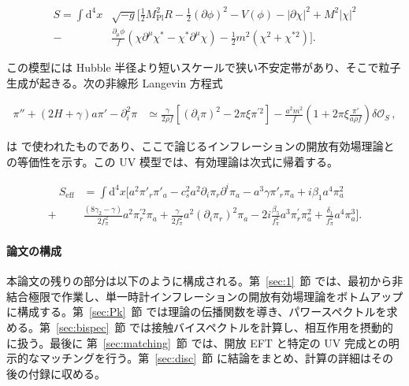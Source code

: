 \documentclass[a4paper,11pt]{ltjsarticle}
\numberwithin{equation}{section}
\def\pia{\pi_{a}}
\def\pir{\pi_{r}}
\newcommand{\dd}{\mathrm{d}}
\newcommand{\Sec}[1]{Sec.~\ref{#1}}
\renewcommand{\Sec}[1]{第~\ref{#1}~節}
\begin{document}
\begin{align}\label{eq:actionmatchintro}
S= \int \dd^4 x &\sqrt{- g} \bigg[ \frac{1}{2} M_{\mathrm{Pl}}^2  R - \frac{1}{2} \left(\partial \phi \right)^2 - V(\phi) - \left|\partial \chi \right|^2 + M^2 \left| \chi \right|^2 \nonumber \\
- &\frac{\partial_\mu \phi}{f}\left( \chi \partial^\mu \chi^* - \chi^* \partial^\mu \chi\right) - \frac{1}{2}m^2\left(\chi^2 + \chi^{*2}\right)\bigg].
\end{align}

この模型には Hubble 半径より短いスケールで狭い不安定帯があり、そこで粒子生成が起きる。次の非線形 Langevin 方程式

\begin{align}\label{eq:Paolointro}
\pi'' + \left( 2H + \gamma\right)a\pi' - \partial_i^2 \pi &\simeq \frac{\gamma}{2\rho f} \left[ \left( \partial_i \pi\right)^2 - 2 \pi \xi \pi^{\prime2}\right] - \frac{a^2m^2}{f} \left(1+2\pi\xi \frac{\pi'}{a \rho f} \right) \delta \mathcal{O}_S\,,
\end{align}

は \cite{Creminelli:2023aly} で使われたものであり、ここで論じるインフレーションの開放有効場理論との等価性を示す。この UV 模型では、有効理論は次式に帰着する。

\begin{align}\label{eq:Seffmatchintro}
\quad S_{\mathrm{eff}} &= \int \dd^4 x \Big[ a^2 \pi'_{r} \pi'_{a} - c_{s}^{2} a^2 \partial_i \pir  \partial^i \pia   -  a^3 \gamma \pi'_{r} \pia + i \beta_1 a^4 \pia^2 \nonumber \\
+ &\frac{ \left(8\gamma_2 - \gamma\right)}{2f^{2}_{\pi}}  a^2\pir^{\prime2} \pia	+ \frac{\gamma}{2f_{\pi}^{2}} a^2	\left(\partial_i \pir \right)^2 \pia - 2i\frac{\beta_{5}}{f_\pi^2} a^3 \pir^{\prime} \pia^2 +\frac{\delta_1}{f_\pi^2} a^4 \pia^3  \Big]. 
\end{align}

\paragraph{論文の構成} 本論文の残りの部分は以下のように構成される。\Sec{sec:1} では、最初から非結合極限で作業し、単一時計インフレーションの開放有効場理論をボトムアップに構成する。\Sec{sec:Pk} では理論の伝播関数を導き、パワースペクトルを求める。\Sec{sec:bispec} では接触バイスペクトルを計算し、相互作用を摂動的に扱う。最後に \Sec{sec:matching} では、開放 EFT と特定の UV 完成との明示的なマッチングを行う。\Sec{sec:disc} に結論をまとめ、計算の詳細はその後の付録に収める。
\end{document}
